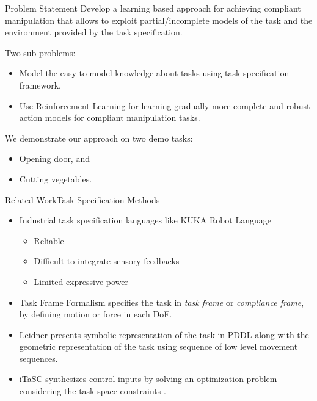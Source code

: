 \documentclass[aspectratio=169]{beamer}
\begin{document}
\begin{frame}{Problem Statement}
	Develop a learning based approach for achieving compliant manipulation that allows to exploit partial/incomplete models of the task and the environment provided by the task specification.
	\vspace{0.5cm}
	
	Two sub-problems:
	\begin{itemize}
		\item Model the easy-to-model knowledge about tasks using task specification framework.
		
		\item Use Reinforcement Learning for learning gradually more complete and robust action models for compliant manipulation tasks.
	\end{itemize}
	
	
	We demonstrate our approach on two demo tasks:
	\begin{itemize}
		\item Opening door, and
		\item Cutting vegetables.
	\end{itemize}
\end{frame}

\begin{frame}[fragile]{Related Work}{\small Task Specification Methods}
	\vspace{-0.5cm}
	\begin{itemize}
		\item Industrial task specification languages like KUKA Robot Language 
		\begin{itemize}
			\item Reliable
			\item Difficult to integrate sensory feedbacks
			\item Limited expressive power \cite{leidner2017cognitive}
	\end{itemize}
		\item Task Frame Formalism specifies the task in \textit{task frame} or \textit{compliance frame}, by defining motion or force in each DoF\cite{nagele2018prototype, mason1981compliance}. 
	\end{itemize}

	\begin{itemize}
		\item Leidner presents symbolic representation of the task in PDDL along with the geometric representation of the task using sequence of low level movement sequences. 
		\item iTaSC synthesizes control inputs by solving an optimization problem considering the task space constraints \cite{DeSchutter-ijrr2007, DecreBruyninckxDeSchutter2013, decre09}. 
		
	\end{itemize}
\end{frame}
\end{document}
